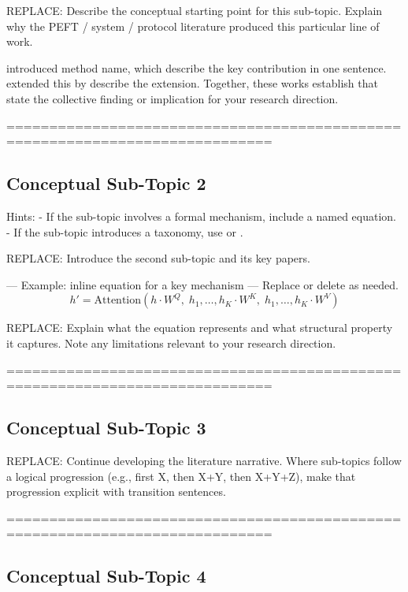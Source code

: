 REPLACE: Describe the conceptual starting point for this sub-topic.
Explain why the PEFT / system / protocol literature produced this particular
line of work.

\citet{ExamplePaper2020} introduced method name, which describe the key
contribution in one sentence. \citet{ExamplePaper2021} extended this by
describe the extension. Together, these works establish that state the
collective finding or implication for your research direction.

 =============================================================================
\subsection{Conceptual Sub-Topic 2}
\label{sec:lit_cluster_N:subtopic2}

 Hints:
 - If the sub-topic involves a formal mechanism, include a named equation.
 - If the sub-topic introduces a taxonomy, use \itemize or \enumerate.

REPLACE: Introduce the second sub-topic and its key papers.

 --- Example: inline equation for a key mechanism ---
 Replace or delete as needed.
\begin{equation}
  h' = \mathrm{Attention}(h \cdot W^Q,\; h_1,\ldots,h_K \cdot W^K,\;
                           h_1,\ldots,h_K \cdot W^V)
  \label{eq:cluster_N_example}
\end{equation}

REPLACE: Explain what the equation represents and what structural property it
captures. Note any limitations relevant to your research direction.

 =============================================================================
\subsection{Conceptual Sub-Topic 3}
\label{sec:lit_cluster_N:subtopic3}

REPLACE: Continue developing the literature narrative. Where sub-topics follow
a logical progression (e.g., first X, then X+Y, then X+Y+Z), make that
progression explicit with transition sentences.

 =============================================================================
\subsection{Conceptual Sub-Topic 4}
\label{sec:lit_cluster_N:subtopic4}

